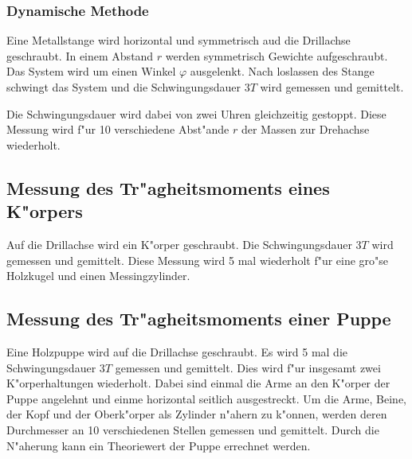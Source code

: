 \subsubsection{Dynamische Methode} %
\label{sub:dynamische_methode}

Eine Metallstange wird horizontal und symmetrisch aud die Drillachse geschraubt.
In einem Abstand $r$ werden symmetrisch Gewichte aufgeschraubt.
Das System wird um einen Winkel $\varphi$ ausgelenkt.
Nach loslassen des Stange schwingt das System und die Schwingungsdauer $3T$ wird gemessen und gemittelt.

Die Schwingungsdauer wird dabei von zwei Uhren gleichzeitig gestoppt.
Diese Messung wird f"ur 10 verschiedene Abst"ande $r$ der Massen zur Drehachse wiederholt.

\subsection{Messung des Tr"agheitsmoments eines K"orpers} %
\label{sub:tr_agheitsmoment_verschiedener_k_orper}

Auf die Drillachse wird ein K"orper geschraubt.
Die Schwingungsdauer $3T$ wird gemessen und gemittelt.
Diese Messung wird 5 mal wiederholt f"ur eine gro"se Holzkugel und einen Messingzylinder.

\subsection{Messung des Tr"agheitsmoments einer Puppe} %
\label{sub:messung_des_tr_agheitsmoments_einer_puppe}

Eine Holzpuppe wird auf die Drillachse geschraubt.
Es wird 5 mal die Schwingungsdauer $3T$ gemessen und gemittelt.
Dies wird f"ur insgesamt zwei K"orperhaltungen wiederholt.
Dabei sind einmal die Arme an den K"orper der Puppe angelehnt und einme horizontal seitlich ausgestreckt.
Um die Arme, Beine, der Kopf und der Oberk"orper als Zylinder n"ahern zu k"onnen, werden deren Durchmesser an 10 verschiedenen Stellen gemessen und gemittelt.
Durch die N"aherung kann ein Theoriewert der Puppe errechnet werden.
